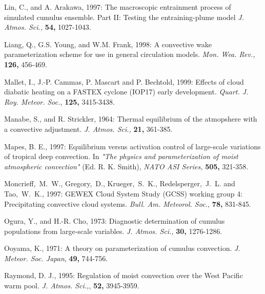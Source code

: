 

\por
Lin, C., and A. Arakawa, 1997: The macroscopic entrainment process of simulated
cumulus ensemble. Part II: Testing the entraining-plume model
{\it J. Atmos. Sci.,} {\bf 54,} 1027-1043.

\por
Liang, Q., G.S. Young, and W.M. Frank, 1998:  A convective wake parameterization
scheme for use in general circulation models.  {\it Mon. Wea. Rev.,} {\bf 126,}
456-469.

\por
Mallet, I., J.-P. Cammas, P. Mascart and P. Bechtold, 1999:
Effects of cloud diabatic heating on a FASTEX cyclone (IOP17) early
development. {\it Quart. J. Roy. Meteor. Soc.}, {\bf 125,} 3415-3438.

\por Manabe, S., and R. Strickler, 1964: Thermal equilibrium
of the atmopshere with a convective adjustment.
{\it J. Atmos. Sci.,} {\bf 21,} 361-385.

\por
Mapes, B. E.,
1997:
 Equilibrium versus activation control of large-scale
variations of tropical deep convection.
In {\it "The physics and parameterization of moist atmospheric convection"}
(Ed. R. K. Smith), {\it NATO ASI Series,} {\bf 505,} 321-358.

\por
Moncrieff,~M.~W., Gregory,~D., Krueger,~S.~K., Redelsperger,~J.~L. and
 Tao,~W.~K.,
 1997:
 GEWEX Cloud System Study (GCSS) working group 4:
 Precipitating convective cloud systems. {\it Bull. Am. Meteorol. Soc.,}
 {\bf 78,} 831-845.

\por
Ogura, Y., and H.-R. Cho, 1973: Diagnostic determination of cumulus
populations from large-scale variables. {\it J. Atmos. Sci.,}
{\bf 30,} 1276-1286.

\por
Ooyama, K., 1971: A theory on parameterization of cumulus convection.
{\it J. Meteor. Soc. Japan}, {\bf 49,} 744-756.

\por
Raymond, D. J., 1995: Regulation of moist convection over the
West Pacific warm pool. {\it J. Atmos. Sci.,}, {\bf 52,} 3945-3959.

